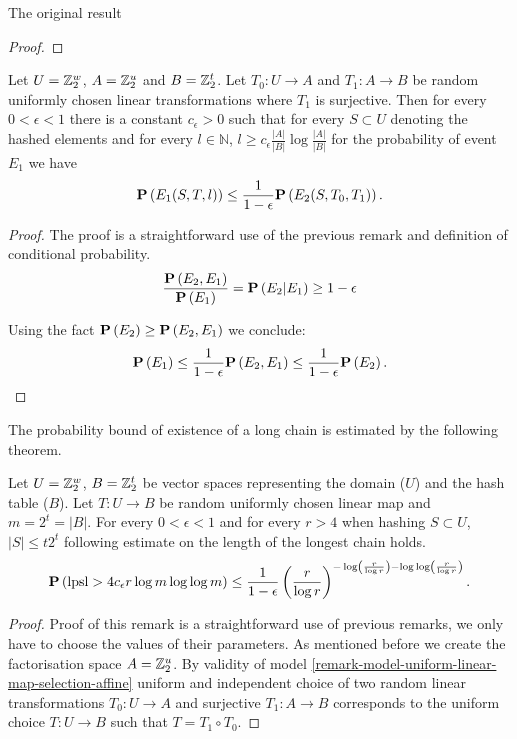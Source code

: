 \begin{section}{The original result}
\begin{proof}
\end{proof}

\begin{corollary}
\label{corollary-prob-e2-e1}
Let $U = \mathbb{Z}_{2}^{w}$, $A = \mathbb{Z}_{2}^{u}$ and $B = \mathbb{Z}_{2}^{t}$. Let $T_0: U \rightarrow A$ and $T_1: A \rightarrow B$ be random uniformly chosen linear transformations where $T_1$ is surjective. Then for every $0 < \epsilon < 1$ there is a constant $c_{\epsilon} > 0$ such that for every $S \subset U$ denoting the hashed  elements and for every $l \in \mathbb{N}$, $l \geq c_{\epsilon}{\frac{|A|}{|B|}}\log\frac{|A|}{|B|}$ for the probability of event $E_1$ we have
\[
	\mathbf{P}\left(E_1(S, T, l)\right) \leq \frac{1}{1 - \epsilon} \mathbf{P}\left(E_2(S, T_0, T_1)\right) \text{.}
\]
\end{corollary}
\begin{proof}
The proof is a straightforward use of the previous remark and definition of conditional probability.
\[
	\frac{\mathbf{P}\left(E_2, E_1\right)}{\mathbf{P}\left(E_1\right)} = \mathbf{P}\left(E_2 | E_1\right) \geq 1 - \epsilon
\]

Using the fact $\mathbf{P}\left(E_2\right) \geq \mathbf{P}\left(E_2, E_1\right)$ we conclude:
\[
	\mathbf{P}\left(E_1\right) \leq \frac{1}{1 - \epsilon}\mathbf{P}\left(E_2, E_1\right) \leq \frac{1}{1 - \epsilon}\mathbf{P}\left(E_2\right) \text{.}
\]
\end{proof}

The probability bound of existence of a long chain is estimated by the following theorem.
\begin{remark}
\label{remark-probability-long-chain}
Let $U = \mathbb{Z}_{2}^{w}$, $B = \mathbb{Z}_{2}^{t}$ be vector spaces representing the domain ($U$) and the hash table ($B$). Let $T: U \rightarrow B$ be random uniformly chosen linear map and $m = 2 ^ t = |B|$. For every $0 < \epsilon < 1$ and for every $r > 4$ when hashing $S \subset U$, $|S| \leq t 2 ^ t$ following estimate on the length of the longest chain holds.
\[
	\mathbf{P}\left(\mathrm{lpsl} > 4 c_\epsilon r \log m \log \log m\right) \leq \frac{1}{1 - \epsilon} \left(\frac{r}{\log r}\right)^{-\log \left(\frac{r}{\log r}\right) - \log \log \left(\frac{r}{\log r}\right)} \text{.}
\]
\end{remark}
\begin{proof}
Proof of this remark is a straightforward use of previous remarks, we only have to choose the values of their parameters. As mentioned before we create the factorisation space $A = \mathbb{Z}_{2}^{u}$. By validity of model \ref{remark-model-uniform-linear-map-selection-affine} uniform and independent choice of two random linear transformations $T_0: U \rightarrow A$ and surjective $T_1: A \rightarrow B$ corresponds to the uniform choice $T: U \rightarrow B$ such that $T = T_1 \circ T_0$.


\end{proof}
\end{section}
